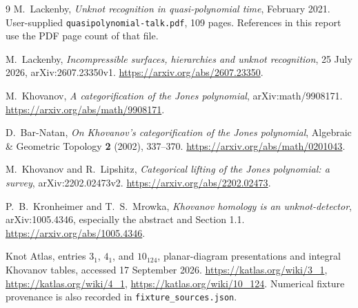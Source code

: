 \documentclass[11pt]{article}
\theoremstyle{definition}
\newcommand{\code}[1]{\texttt{#1}}
\begin{document}
\begin{thebibliography}{9}
M.~Lackenby, \emph{Unknot recognition in quasi-polynomial time}, February 2021.
User-supplied \code{quasipolynomial-talk.pdf}, 109 pages. References in this
report use the PDF page count of that file.

M.~Lackenby, \emph{Incompressible surfaces, hierarchies and unknot recognition},
25 July 2026, arXiv:2607.23350v1.
\url{https://arxiv.org/abs/2607.23350}.

M.~Khovanov, \emph{A categorification of the Jones polynomial},
arXiv:math/9908171.
\url{https://arxiv.org/abs/math/9908171}.

D.~Bar-Natan, \emph{On Khovanov's categorification of the Jones polynomial},
Algebraic \& Geometric Topology \textbf{2} (2002), 337--370.
\url{https://arxiv.org/abs/math/0201043}.

M.~Khovanov and R.~Lipshitz, \emph{Categorical lifting of the Jones polynomial:
a survey}, arXiv:2202.02473v2.
\url{https://arxiv.org/abs/2202.02473}.

P.~B.~Kronheimer and T.~S.~Mrowka, \emph{Khovanov homology is an unknot-detector},
arXiv:1005.4346, especially the abstract and Section 1.1.
\url{https://arxiv.org/abs/1005.4346}.

Knot Atlas, entries $3_1$, $4_1$, and $10_{124}$, planar-diagram presentations
and integral Khovanov tables, accessed 17 September 2026.
\url{https://katlas.org/wiki/3_1},
\url{https://katlas.org/wiki/4_1},
\url{https://katlas.org/wiki/10_124}.
Numerical fixture provenance is also recorded in
\code{fixture\_sources.json}.
\end{thebibliography}
\end{document}
